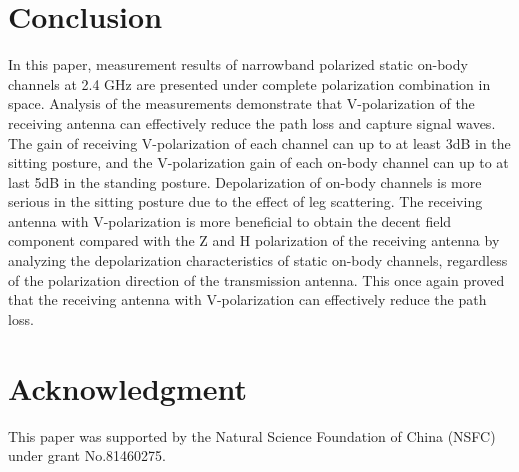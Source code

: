 \documentclass[conference]{IEEEtran}
\begin{document}
\section{Conclusion}\label{sec:conclusion}
In this paper, measurement results of narrowband polarized static on-body channels at 2.4 GHz are presented under complete polarization combination in space. Analysis of the measurements demonstrate that V-polarization of the receiving antenna can effectively reduce the path loss and capture signal waves. The gain of receiving V-polarization of each channel can up to at least 3dB in the sitting posture, and the V-polarization gain of each on-body channel can up to at last 5dB in the standing posture. Depolarization of on-body channels is more serious in the sitting posture due to the effect of leg scattering. The receiving antenna with V-polarization is more beneficial to  obtain the decent field component compared with the Z and H polarization of the receiving antenna by analyzing the depolarization characteristics of static on-body channels, regardless of the polarization direction of the transmission antenna. This once again proved that the receiving antenna with V-polarization can effectively reduce the path loss.

\section*{Acknowledgment}
This paper was supported by the Natural Science Foundation of China (NSFC) under grant No.81460275.
\end{document}
